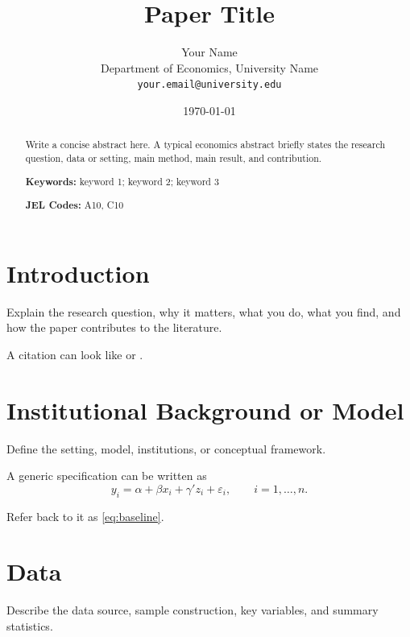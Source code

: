 \documentclass[11pt]{article}
\title{Paper Title}
\author{
    Your Name\\
    Department of Economics, University Name\\
    \texttt{your.email@university.edu}
}
\date{\today}
\begin{document}
\maketitle

\begin{abstract}
Write a concise abstract here. A typical economics abstract briefly states the research question, data or setting, main method, main result, and contribution.

\vspace{0.5em}
\noindent\textbf{Keywords:} keyword 1; keyword 2; keyword 3

\noindent\textbf{JEL Codes:} A10, C10
\end{abstract}

\section{Introduction}\label{sec:introduction}
Explain the research question, why it matters, what you do, what you find, and how the paper contributes to the literature.

A citation can look like \citet{example2020} or \citep{example2020}.

\section{Institutional Background or Model}\label{sec:background}
Define the setting, model, institutions, or conceptual framework.

A generic specification can be written as
\begin{equation}\label{eq:baseline}
    y_i = \alpha + \beta x_i + \gamma' z_i + \varepsilon_i,
    \qquad i=1,\ldots,n.
\end{equation}

Refer back to it as \cref{eq:baseline}.

\section{Data}\label{sec:data}
Describe the data source, sample construction, key variables, and summary statistics.
\end{document}
